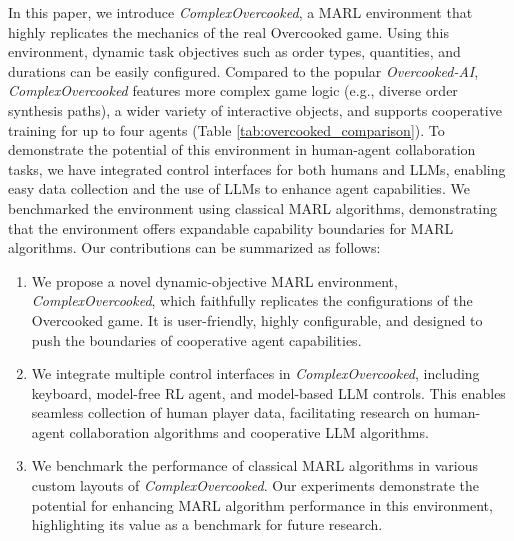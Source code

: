 In this paper, we introduce \textit{ComplexOvercooked}, a MARL environment that highly replicates the mechanics of the real Overcooked game. Using this environment, dynamic task objectives such as order types, quantities, and durations can be easily configured. Compared to the popular \textit{Overcooked-AI}, \textit{ComplexOvercooked} features more complex game logic (e.g., diverse order synthesis paths), a wider variety of interactive objects, and supports cooperative training for up to four agents (Table \ref{tab:overcooked_comparison}). To demonstrate the potential of this environment in human-agent collaboration tasks, we have integrated control interfaces for both humans and LLMs, enabling easy data collection and the use of LLMs to enhance agent capabilities. We benchmarked the environment using classical MARL algorithms, demonstrating that the environment offers expandable capability boundaries for MARL algorithms. Our contributions can be summarized as follows:
\begin{enumerate}
\item We propose a novel dynamic-objective MARL environment, \textit{ComplexOvercooked}, which faithfully replicates the configurations of the Overcooked game. It is user-friendly, highly configurable, and designed to push the boundaries of cooperative agent capabilities.
\item We integrate multiple control interfaces in \textit{ComplexOvercooked}, including keyboard, model-free RL agent, and model-based LLM controls. This enables seamless collection of human player data, facilitating research on human-agent collaboration algorithms and cooperative LLM algorithms.
\item We benchmark the performance of classical MARL algorithms in various custom layouts of \textit{ComplexOvercooked}. Our experiments demonstrate the potential for enhancing MARL algorithm performance in this environment, highlighting its value as a benchmark for future research.
\end{enumerate}


